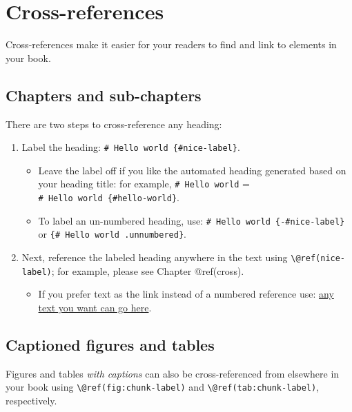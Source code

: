 \documentclass[
]{article}
\author{}
\date{\vspace{-2.5em}}
\providecommand{\tightlist}{%
  \setlength{\itemsep}{0pt}\setlength{\parskip}{0pt}}
\begin{document}
\hypertarget{cross}{%
\section{Cross-references}\label{cross}}

Cross-references make it easier for your readers to find and link to
elements in your book.

\hypertarget{chapters-and-sub-chapters}{%
\subsection{Chapters and sub-chapters}\label{chapters-and-sub-chapters}}

There are two steps to cross-reference any heading:

\begin{enumerate}
\def\labelenumi{\arabic{enumi}.}
\item
  Label the heading: \texttt{\#\ Hello\ world\ \{\#nice-label\}}.

  \begin{itemize}
  \tightlist
  \item
    Leave the label off if you like the automated heading generated
    based on your heading title: for example, \texttt{\#\ Hello\ world}
    = \texttt{\#\ Hello\ world\ \{\#hello-world\}}.
  \item
    To label an un-numbered heading, use:
    \texttt{\#\ Hello\ world\ \{-\#nice-label\}} or
    \texttt{\{\#\ Hello\ world\ .unnumbered\}}.
  \end{itemize}
\item
  Next, reference the labeled heading anywhere in the text using
  \texttt{\textbackslash{}@ref(nice-label)}; for example, please see
  Chapter @ref(cross).

  \begin{itemize}
  \tightlist
  \item
    If you prefer text as the link instead of a numbered reference use:
    \protect\hyperlink{cross}{any text you want can go here}.
  \end{itemize}
\end{enumerate}

\hypertarget{captioned-figures-and-tables}{%
\subsection{Captioned figures and
tables}\label{captioned-figures-and-tables}}

Figures and tables \emph{with captions} can also be cross-referenced
from elsewhere in your book using
\texttt{\textbackslash{}@ref(fig:chunk-label)} and
\texttt{\textbackslash{}@ref(tab:chunk-label)}, respectively.
\end{document}
